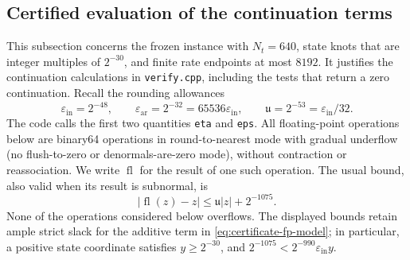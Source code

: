 \subsection{Certified evaluation of the continuation terms}
\label{sec:certificate-continuation-roundoff}

This subsection concerns the frozen instance with $N_t=640$, state knots
that are integer multiples of $2^{-30}$, and finite rate endpoints at most
$8192$. It justifies the continuation calculations in
\texttt{verify.cpp}, including the tests that return a zero continuation.
Recall the rounding allowances
\[
 \varepsilon_{\mathrm{in}}=2^{-48},\qquad
 \varepsilon_{\mathrm{ar}}=2^{-32}
       =65536\varepsilon_{\mathrm{in}},\qquad
 \mathfrak u=2^{-53}=\varepsilon_{\mathrm{in}}/32.
\]
The code calls the first two quantities \texttt{eta} and \texttt{eps}.
All floating-point operations below are binary64 operations in
round-to-nearest mode with gradual underflow (no flush-to-zero or
denormals-are-zero mode), without contraction or reassociation. We write
$\operatorname{fl}$ for the result of one such operation. The usual
bound, also valid when its result is subnormal, is
\begin{equation}
 |\operatorname{fl}(z)-z|
 \le \mathfrak u|z|+2^{-1075}.
 \label{eq:certificate-fp-model}
\end{equation}
None of the operations considered below overflows. The displayed bounds
retain ample strict slack for the additive term in
\eqref{eq:certificate-fp-model}; in particular, a positive state coordinate
satisfies $y\ge 2^{-30}$, and
$2^{-1075}<2^{-990}\varepsilon_{\mathrm{in}}y$.

